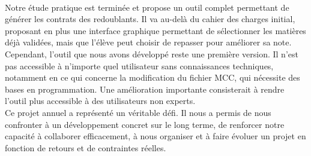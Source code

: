 \\
Notre étude pratique est terminée et propose un outil complet permettant de générer les contrats des redoublants. Il va au-delà du cahier des charges initial, 
proposant en plus une interface graphique permettant de sélectionner les matières déjà validées, mais que l'élève peut choisir de repasser pour améliorer sa note.
\\
Cependant, l'outil que nous avons développé reste une première version.
Il n’est pas accessible à n’importe quel utilisateur sans connaissances techniques, notamment en ce qui concerne la modification du fichier MCC, qui nécessite des bases en programmation. 
Une amélioration importante consisterait à rendre l’outil plus accessible à des utilisateurs non experts.
\\
Ce projet annuel a représenté un véritable défi. 
Il nous a permis de nous confronter à un développement concret sur le long terme, de renforcer notre capacité à collaborer efficacement, à nous organiser et à faire évoluer un projet en fonction de retours et de contraintes réelles.
